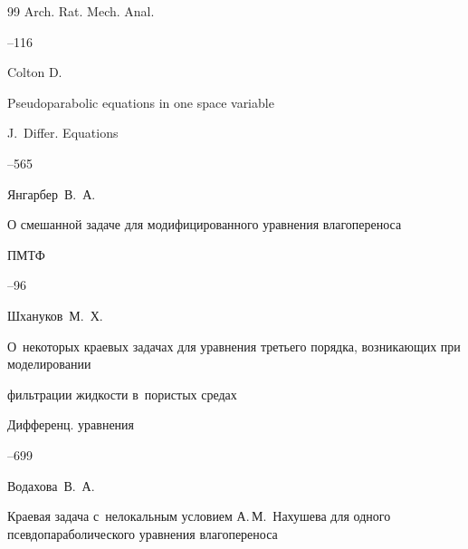 \begin{thebibliography}{99}
\jour  Arch. Rat. Mech. Anal.




--116




\by Colton D.

\paper Pseudoparabolic equations in one space variable

\jour J.~Differ. Equations




--565


		


\by Янгарбер~В.~А.

\paper О смешанной задаче для модифицированного уравнения влагопереноса

\jour ПМТФ



--96




\by Шхануков~М.~Х.

\paper О~некоторых краевых задачах для уравнения третьего порядка, возникающих при моделировании

фильтрации жидкости в~пористых средах

\jour Дифференц. уравнения




--699









\by Водахова~В.~А.

\paper Краевая задача с~нелокальным условием А.\,М.~Нахушева для одного псевдопараболического уравнения влагопереноса


\end{thebibliography}
